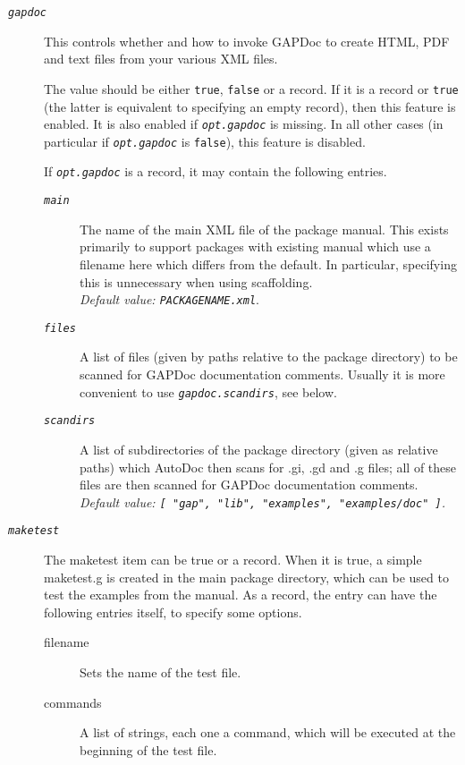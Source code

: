 \documentclass[a4paper,11pt]{report}
\begin{document}
{{{\begin{description}
\begin{description}
\item[{\mbox{\texttt{\mdseries\slshape gapdoc}}}]  This controls whether and how to invoke \textsf{GAPDoc} to create HTML, PDF and text files from your various XML files. 

 The value should be either \texttt{true}, \texttt{false} or a record. If it is a record or \texttt{true} (the latter is equivalent to specifying an empty record), then this feature is
enabled. It is also enabled if \mbox{\texttt{\mdseries\slshape opt.gapdoc}} is missing. In all other cases (in particular if \mbox{\texttt{\mdseries\slshape opt.gapdoc}} is \texttt{false}), this feature is disabled. 

 If \mbox{\texttt{\mdseries\slshape opt.gapdoc}} is a record, it may contain the following entries. 
\begin{description}
\item[{\mbox{\texttt{\mdseries\slshape main}}}]  The name of the main XML file of the package manual. This exists primarily to
support packages with existing manual which use a filename here which differs
from the default. In particular, specifying this is unnecessary when using
scaffolding. \\
 \emph{Default value: \texttt{PACKAGENAME.xml}}. 
\item[{\mbox{\texttt{\mdseries\slshape files}}}]  A list of files (given by paths relative to the package directory) to be
scanned for \textsf{GAPDoc} documentation comments. Usually it is more convenient to use \mbox{\texttt{\mdseries\slshape gapdoc.scan{\textunderscore}dirs}}, see below. 
\item[{\mbox{\texttt{\mdseries\slshape scan{\textunderscore}dirs}}}]  A list of subdirectories of the package directory (given as relative paths)
which \textsf{AutoDoc} then scans for .gi, .gd and .g files; all of these files are then scanned for \textsf{GAPDoc} documentation comments. \\
 \emph{Default value: \texttt{[ "gap", "lib", "examples", "examples/doc" ]}.} 
\end{description}
 
\item[{\mbox{\texttt{\mdseries\slshape maketest}}}]  The maketest item can be true or a record. When it is true, a simple
maketest.g is created in the main package directory, which can be used to test
the examples from the manual. As a record, the entry can have the following
entries itself, to specify some options. 
\begin{description}
\item[{filename}]  Sets the name of the test file. 
\item[{commands}]  A list of strings, each one a command, which will be executed at the beginning
of the test file. 
\end{description}
 
\end{description}
 
\end{description}
 }

 }

 }
\end{document}
